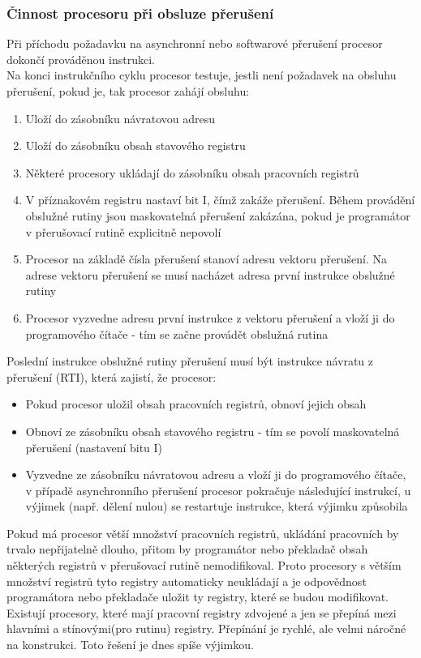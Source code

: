 \subsubsection*{Činnost procesoru při obsluze přerušení}
Při příchodu požadavku na asynchronní nebo softwarové přerušení procesor dokončí prováděnou instrukci. \\
Na konci instrukčního cyklu procesor testuje, jestli není požadavek na obsluhu přerušení, pokud je, tak procesor zahájí obsluhu:
\begin{enumerate}
    \item Uloží do zásobníku návratovou adresu
    \item Uloží do zásobníku obsah stavového registru
    \item Některé procesory ukládají do zásobníku obsah pracovních registrů
    \item V příznakovém registru nastaví bit I, čímž zakáže přerušení. Během provádění obslužné rutiny jsou maskovatelná přerušení zakázána, pokud je programátor v přerušovací rutině explicitně nepovolí
    \item Procesor na základě čísla přerušení stanoví adresu vektoru přerušení. Na adrese vektoru přerušení se musí nacházet adresa první instrukce obslužné rutiny
    \item Procesor vyzvedne adresu první instrukce z vektoru přerušení a vloží ji do programového čítače - tím se začne provádět obslužná rutina
\end{enumerate}
Poslední instrukce obslužné rutiny přerušení musí být instrukce návratu z přerušení (RTI), která zajistí, že procesor:
\begin{itemize}
    \item Pokud procesor uložil obsah pracovních registrů, obnoví jejich obsah
    \item Obnoví ze zásobníku obsah stavového registru - tím se povolí maskovatelná přerušení (nastavení bitu I)
    \item Vyzvedne ze zásobníku návratovou adresu a vloží ji do programového čítače, v případě asynchronního přerušení procesor pokračuje následující instrukcí, u výjimek (např. dělení nulou) se restartuje instrukce, která výjimku způsobila
\end{itemize}
Pokud má procesor větší množství pracovních registrů, ukládání pracovních by trvalo nepřijatelně dlouho, přitom by programátor nebo překladač obsah některých registrů v přerušovací rutině nemodifikoval. Proto procesory s větším množství registrů tyto registry automaticky neukládají a je odpovědnost programátora nebo překladače uložit ty registry, které se budou modifikovat.\\
Existují procesory, které mají pracovní registry zdvojené a jen se přepíná mezi hlavními a stínovými(pro rutinu) registry. Přepínání je rychlé, ale velmi náročné na konstrukci. Toto řešení je dnes spíše výjimkou. \\

